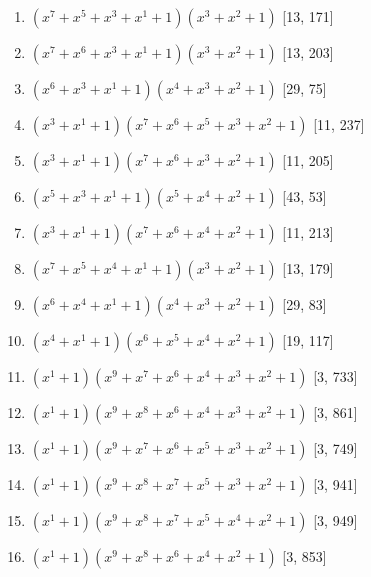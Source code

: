 \documentclass[10pt,twocolumn]{article}
\begin{document}
\begin{enumerate}
\item $(x^{7} + x^{5} + x^{3} + x^{1} + 1)(x^{3} + x^{2} + 1)$  [13, 171]
\item $(x^{7} + x^{6} + x^{3} + x^{1} + 1)(x^{3} + x^{2} + 1)$  [13, 203]
\item $(x^{6} + x^{3} + x^{1} + 1)(x^{4} + x^{3} + x^{2} + 1)$  [29, 75]
\item $(x^{3} + x^{1} + 1)(x^{7} + x^{6} + x^{5} + x^{3} + x^{2} + 1)$  [11, 237]
\item $(x^{3} + x^{1} + 1)(x^{7} + x^{6} + x^{3} + x^{2} + 1)$  [11, 205]
\item $(x^{5} + x^{3} + x^{1} + 1)(x^{5} + x^{4} + x^{2} + 1)$  [43, 53]
\item $(x^{3} + x^{1} + 1)(x^{7} + x^{6} + x^{4} + x^{2} + 1)$  [11, 213]
\item $(x^{7} + x^{5} + x^{4} + x^{1} + 1)(x^{3} + x^{2} + 1)$  [13, 179]
\item $(x^{6} + x^{4} + x^{1} + 1)(x^{4} + x^{3} + x^{2} + 1)$  [29, 83]
\item $(x^{4} + x^{1} + 1)(x^{6} + x^{5} + x^{4} + x^{2} + 1)$  [19, 117]
\item $(x^{1} + 1)(x^{9} + x^{7} + x^{6} + x^{4} + x^{3} + x^{2} + 1)$  [3, 733]
\item $(x^{1} + 1)(x^{9} + x^{8} + x^{6} + x^{4} + x^{3} + x^{2} + 1)$  [3, 861]
\item $(x^{1} + 1)(x^{9} + x^{7} + x^{6} + x^{5} + x^{3} + x^{2} + 1)$  [3, 749]
\item $(x^{1} + 1)(x^{9} + x^{8} + x^{7} + x^{5} + x^{3} + x^{2} + 1)$  [3, 941]
\item $(x^{1} + 1)(x^{9} + x^{8} + x^{7} + x^{5} + x^{4} + x^{2} + 1)$  [3, 949]
\item $(x^{1} + 1)(x^{9} + x^{8} + x^{6} + x^{4} + x^{2} + 1)$  [3, 853]
\end{enumerate}
\end{document}
